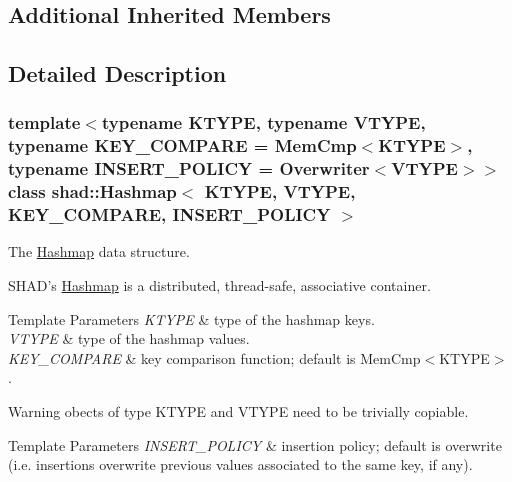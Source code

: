 \subsection*{Additional Inherited Members}


\subsection{Detailed Description}
\subsubsection*{template$<$typename K\-T\-Y\-P\-E, typename V\-T\-Y\-P\-E, typename K\-E\-Y\-\_\-\-C\-O\-M\-P\-A\-R\-E = Mem\-Cmp$<$\-K\-T\-Y\-P\-E$>$, typename I\-N\-S\-E\-R\-T\-\_\-\-P\-O\-L\-I\-C\-Y = Overwriter$<$\-V\-T\-Y\-P\-E$>$$>$class shad\-::\-Hashmap$<$ K\-T\-Y\-P\-E, V\-T\-Y\-P\-E, K\-E\-Y\-\_\-\-C\-O\-M\-P\-A\-R\-E, I\-N\-S\-E\-R\-T\-\_\-\-P\-O\-L\-I\-C\-Y $>$}

The \hyperlink{classshad_1_1Hashmap}{Hashmap} data structure. 

S\-H\-A\-D's \hyperlink{classshad_1_1Hashmap}{Hashmap} is a distributed, thread-\/safe, associative container. 
\begin{DoxyTemplParams}{Template Parameters}
{\em K\-T\-Y\-P\-E} & type of the hashmap keys. \\
\hline
{\em V\-T\-Y\-P\-E} & type of the hashmap values. \\
\hline
{\em K\-E\-Y\-\_\-\-C\-O\-M\-P\-A\-R\-E} & key comparison function; default is Mem\-Cmp$<$\-K\-T\-Y\-P\-E$>$. \\
\hline
\end{DoxyTemplParams}
\begin{DoxyWarning}{Warning}
obects of type K\-T\-Y\-P\-E and V\-T\-Y\-P\-E need to be trivially copiable. 
\end{DoxyWarning}

\begin{DoxyTemplParams}{Template Parameters}
{\em I\-N\-S\-E\-R\-T\-\_\-\-P\-O\-L\-I\-C\-Y} & insertion policy; default is overwrite (i.\-e. insertions overwrite previous values associated to the same key, if any). \\
\hline
\end{DoxyTemplParams}


